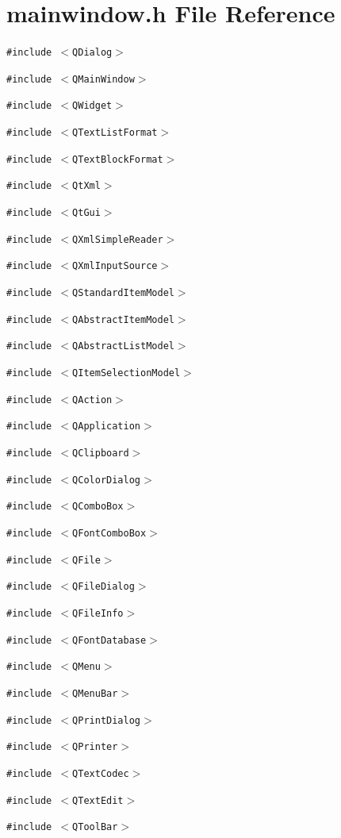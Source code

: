 \section{mainwindow.h File Reference}
\label{mainwindow_8h}
{\tt \#include $<$QDialog$>$}\par
{\tt \#include $<$QMain\-Window$>$}\par
{\tt \#include $<$QWidget$>$}\par
{\tt \#include $<$QText\-List\-Format$>$}\par
{\tt \#include $<$QText\-Block\-Format$>$}\par
{\tt \#include $<$Qt\-Xml$>$}\par
{\tt \#include $<$Qt\-Gui$>$}\par
{\tt \#include $<$QXml\-Simple\-Reader$>$}\par
{\tt \#include $<$QXml\-Input\-Source$>$}\par
{\tt \#include $<$QStandard\-Item\-Model$>$}\par
{\tt \#include $<$QAbstract\-Item\-Model$>$}\par
{\tt \#include $<$QAbstract\-List\-Model$>$}\par
{\tt \#include $<$QItem\-Selection\-Model$>$}\par
{\tt \#include $<$QAction$>$}\par
{\tt \#include $<$QApplication$>$}\par
{\tt \#include $<$QClipboard$>$}\par
{\tt \#include $<$QColor\-Dialog$>$}\par
{\tt \#include $<$QCombo\-Box$>$}\par
{\tt \#include $<$QFont\-Combo\-Box$>$}\par
{\tt \#include $<$QFile$>$}\par
{\tt \#include $<$QFile\-Dialog$>$}\par
{\tt \#include $<$QFile\-Info$>$}\par
{\tt \#include $<$QFont\-Database$>$}\par
{\tt \#include $<$QMenu$>$}\par
{\tt \#include $<$QMenu\-Bar$>$}\par
{\tt \#include $<$QPrint\-Dialog$>$}\par
{\tt \#include $<$QPrinter$>$}\par
{\tt \#include $<$QText\-Codec$>$}\par
{\tt \#include $<$QText\-Edit$>$}\par
{\tt \#include $<$QTool\-Bar$>$}\par
